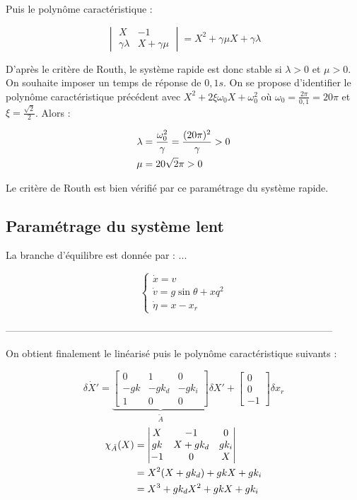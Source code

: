 \documentclass[10pt]{article}
\begin{document}
\noindent Puis le polynôme caractéristique :

\[
	\begin{vmatrix}
		X & -1 \\
		\gamma \lambda & X + \gamma \mu
	\end{vmatrix}
	= X^2 + \gamma \mu X + \gamma \lambda
\]

\noindent D'après le critère de Routh, le système rapide est donc stable si $\lambda > 0$ et $\mu > 0$. On souhaite
imposer un temps de réponse de $0,1 s$. On se propose d'identifier le polynôme caractéristique précédent avec
$X^2 + 2 \xi \omega_0 X + \omega_0^2$ où $\omega_0 = \frac{2 \pi}{0,1} = 20 \pi$ et $\xi = \frac{\sqrt 2}{2}$.
Alors :

\begin{align}
	\lambda &= \frac{\omega_0^2}{\gamma} = \frac{(20 \pi)^2}{\gamma} > 0 \notag \\
	\mu &= 20 \sqrt 2	 \pi > 0 \notag
\end{align}

\noindent Le critère de Routh est bien vérifié par ce paramétrage du système rapide.

\subsection*{Paramétrage du système lent}

\noindent La branche d'équilibre est donnée par : ...

\[
	 \begin{cases}
	 	\dot x = v \\
		\dot v = g \sin \theta + x q^2 \\
		\dot \eta = x - x_r
	\end{cases}
\]



---------------------------------------------------------------------------------------------------


\noindent On obtient finalement le linéarisé puis le polynôme caractéristique suivants :

\[
	\delta \dot X' = \underbrace{
	\begin{bmatrix}
		0 & 1 & 0 \\
		- g k & - g k_d & - g k_i \\
		1 & 0 & 0
	\end{bmatrix}
	}_{\tilde A}
	\delta X'
	+
	\begin{bmatrix}
		0 \\
		0 \\
		- 1
	\end{bmatrix}
	\delta x_r
\]
\begin{align}
	\chi_{\tilde A} ( X) &=
	\begin{vmatrix}
		X & - 1 & 0 \\
		g k & X + g k_d & g k_i \\
		- 1 & 0 & X
	\end{vmatrix} \notag \\
	&= X^2 ( X + g k_d ) + g k X + g k_i \notag \\
	&= X^3 + g k_d X^2 + g k X + g k_i \notag
\end{align}
\end{document}
